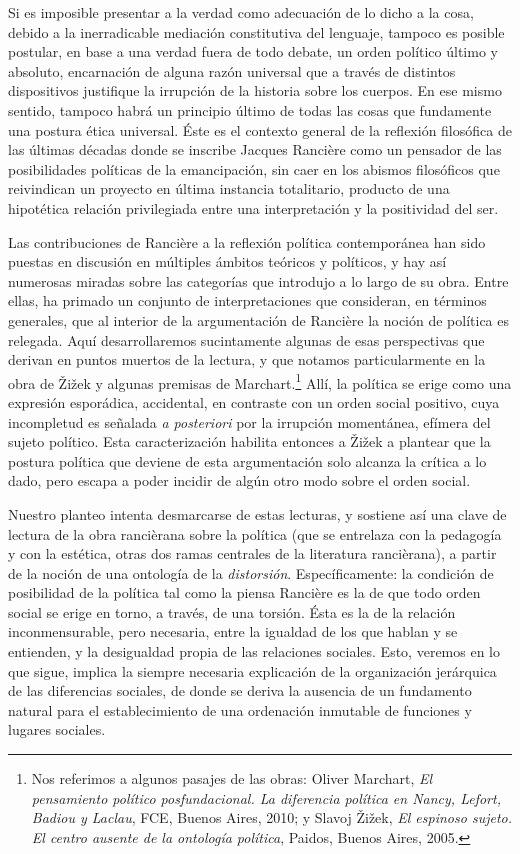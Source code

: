 Si es imposible presentar a la verdad como adecuación de lo dicho a la
cosa, debido a la inerradicable mediación constitutiva del lenguaje,
tampoco es posible postular, en base a una verdad fuera de todo debate,
un orden político último y absoluto, encarnación de alguna razón
universal que a través de distintos dispositivos justifique la irrupción
de la historia sobre los cuerpos. En ese mismo sentido, tampoco habrá un
principio último de todas las cosas que fundamente una postura ética
universal. Éste es el contexto general de la reflexión filosófica de las
últimas décadas donde se inscribe Jacques Rancière como un pensador de
las posibilidades políticas de la emancipación, sin caer en los abismos
filosóficos que reivindican un proyecto en última instancia totalitario,
producto de una hipotética relación privilegiada entre una
interpretación y la positividad del ser.

Las contribuciones de Rancière a la reflexión política contemporánea han
sido puestas en discusión en múltiples ámbitos teóricos y políticos, y
hay así numerosas miradas sobre las categorías que introdujo a lo largo
de su obra. Entre ellas, ha primado un conjunto de interpretaciones que
consideran, en términos generales, que al interior de la argumentación
de Rancière la noción de política es relegada. Aquí desarrollaremos
sucintamente algunas de esas perspectivas que derivan en puntos muertos
de la lectura, y que notamos particularmente en la obra de Žižek y
algunas premisas de Marchart.\footnote{Nos referimos a algunos pasajes
  de las obras: Oliver Marchart, \emph{El pensamiento político
  posfundacional. La diferencia política en Nancy, Lefort, Badiou y
  Laclau}, FCE, Buenos Aires, 2010; y Slavoj Žižek, \emph{El espinoso
  sujeto. El centro ausente de la ontología política}, Paidos, Buenos
  Aires, 2005.} Allí, la política se erige como una expresión
esporádica, accidental, en contraste con un orden social positivo, cuya
incompletud es señalada \emph{a posteriori} por la irrupción momentánea,
efímera del sujeto político. Esta caracterización habilita entonces a
Žižek a plantear que la postura política que deviene de esta
argumentación solo alcanza la crítica a lo dado, pero escapa a poder
incidir de algún otro modo sobre el orden social.

Nuestro planteo intenta desmarcarse de estas lecturas, y sostiene así
una clave de lectura de la obra rancièrana sobre la política (que se
entrelaza con la pedagogía y con la estética, otras dos ramas centrales
de la literatura rancièrana), a partir de la noción de una ontología de
la \emph{distorsión}. Específicamente: la condición de posibilidad de la
política tal como la piensa Rancière es la de que todo orden social se
erige en torno, a través, de una torsión. Ésta es la de la relación
inconmensurable, pero necesaria, entre la igualdad de los que hablan y
se entienden, y la desigualdad propia de las relaciones sociales. Esto,
veremos en lo que sigue, implica la siempre necesaria explicación de la
organización jerárquica de las diferencias sociales, de donde se deriva
la ausencia de un fundamento natural para el establecimiento de una
ordenación inmutable de funciones y lugares sociales.

